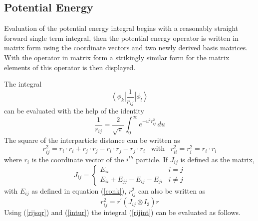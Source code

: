 \documentclass[12pt,thmsa,suthesis,verbatim]{report}
\begin{document}
\subsection{Potential Energy}

Evaluation of the potential energy integral begins with a reasonably
straight forward single term integral, then the potential energy operator is
written in matrix form using the coordinate vectors and two newly derived
basis matrices. With the operator in matrix form a strikingly similar form
for the matrix elements of this operator is then displayed.

The integral 
\begin{equation}
\left\langle \phi _k\right| \frac 1{r_{ij}}\left| \phi _l\right\rangle
\label{rijint}
\end{equation}
can be evaluated with the help of the identity 
\begin{equation}
\frac 1{r_{ij}}=\frac 2{\sqrt{\pi }}\int_0^\infty e^{-u^2r_{ij}^2}\,du
\label{intur}
\end{equation}
The square of the interparticle distance can be written as 
\begin{equation}
r_{ij}^2=r_i\cdot r_i+r_j\cdot r_j-r_i\cdot r_j-r_j\cdot r_i\;\;\;\text{with}%
\;\;\;r_{ii}^2=r_i^2=r_i\cdot r_i  \label{rij2}
\end{equation}
where $r_i$ is the coordinate vector of the $i^{th}$ particle. If $J_{ij}$
is defined as the matrix, 
\begin{equation}
J_{ij}=\left\{ 
\begin{array}{ll}
E_{ii} & i=j \\ 
E_{ii}+E_{jj}-E_{ij}-E_{ji} & i\neq j
\end{array}
\right.  \label{Jij}
\end{equation}
with $E_{ij}$ as defined in equation (\ref{conk}), $r_{ij}^2$ can also be
written as 
\begin{equation}
r_{ij}^2=r^{\prime }\left( J_{ij}\otimes I_3\right) r  \label{rijsqr}
\end{equation}
Using (\ref{rijsqr}) and (\ref{intur}) the integral (\ref{rijint}) can be
evaluated as follows. 
\end{document}

